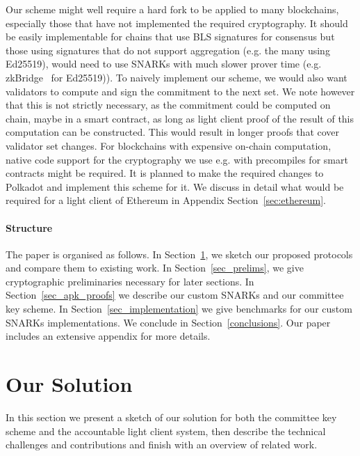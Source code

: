 \noindent Our scheme might well require a hard fork to be applied to many blockchains, especially those that have not implemented the required cryptography. It should be easily implementable for chains that use BLS signatures for consensus but those using signatures that do not support aggregation (e.g. the many using Ed25519), would need to use SNARKs with much slower prover time (e.g. zkBridge~\cite{zkBridge} for Ed25519)). To naively implement our scheme, we would also want validators to compute and sign the commitment to the next set. We note however that this is not strictly necessary, as the commitment could be computed on chain, maybe in a smart contract, as long as light client proof of the result of this computation can be constructed. This would result in longer proofs that cover validator set changes. For blockchains with expensive on-chain computation, native code support for the cryptography we use e.g. with precompiles for smart contracts might be required. It is planned to make the required changes to Polkadot and implement this scheme for it. We discuss in detail what would be required for a light client of Ethereum in Appendix Section~\ref{sec:ethereum}.
\vspace{-0.1in}
\paragraph{Structure} The paper is organised as follows. 
In Section~\ref{sec:sketch}, we sketch our proposed protocols and compare 
them to existing work. In Section~\ref{sec_prelims}, we give cryptographic 
preliminaries necessary for later sections. In Section~\ref{sec_apk_proofs}
we describe our custom SNARKs and our committee key scheme. In 
Section~\ref{sec_implementation} we give benchmarks for our custom SNARKs 
implementations. We conclude in Section~\ref{conclusions}. Our paper includes 
an extensive appendix for more details.%
\vspace{-0.25cm}
\section{Our Solution} 
\label{sec:sketch}
\vspace{-0.2cm}

In this section we present a sketch of our solution for both the committee key scheme and the accountable light client system, 
then describe the technical challenges and contributions and finish with an overview of related work.

